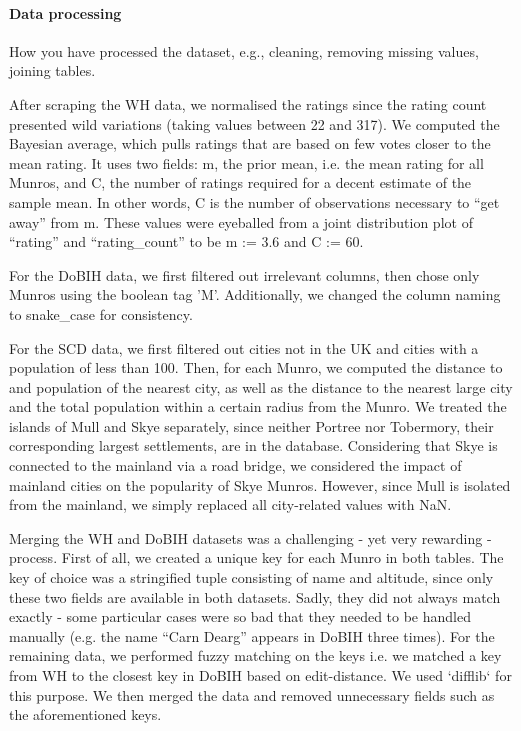 \documentclass[11pt,a4paper]{article}
\begin{document}
\paragraph{Data processing} How you have processed the dataset, e.g.,
cleaning, removing missing values, joining tables.

\medskip 

After scraping the WH data, we normalised the ratings since the rating count presented wild variations (taking values between 22 and 317). We computed the Bayesian average, which pulls ratings that are based on few votes closer to the mean rating. It uses two fields: m, the prior mean, i.e. the mean rating for all Munros, and C, the number of ratings required for a decent estimate of the sample mean. In other words, C is the number of observations necessary to “get away” from m. These values were eyeballed from a joint distribution plot of “rating” and “rating\_count” to be m := 3.6 and C := 60.

\smallskip
For the DoBIH data, we first filtered out irrelevant columns, then chose only Munros using the boolean tag 'M'. Additionally, we changed the column naming to snake\_case for consistency.

\smallskip
For the SCD data, we first filtered out cities not in the UK and cities with a population of less than 100. Then, for each Munro, we computed the distance to and population of the nearest city, as well as the distance to the nearest large city and the total population within a certain radius from the Munro. We treated the islands of Mull and Skye separately, since neither Portree nor Tobermory, their corresponding largest settlements, are in the database. Considering that Skye is connected to the mainland via a road bridge, we considered the impact of mainland cities on the popularity of Skye Munros. However, since Mull is isolated from the mainland, we simply replaced all city-related values with NaN.

\medskip 
Merging the WH and DoBIH datasets was a challenging - yet very rewarding - process. First of all, we created a unique key for each Munro in both tables. The key of choice was a stringified tuple consisting of name and altitude, since only these two fields are available in both datasets. Sadly, they did not always match exactly - some particular cases were so bad that they needed to be handled manually (e.g. the name “Carn Dearg” appears in DoBIH three times). For the remaining data, we performed fuzzy matching on the keys i.e. we matched a key from WH to the closest key in DoBIH based on edit-distance.  We used `difflib` for this purpose. We then merged the data and removed unnecessary fields such as the aforementioned keys.
\end{document}
